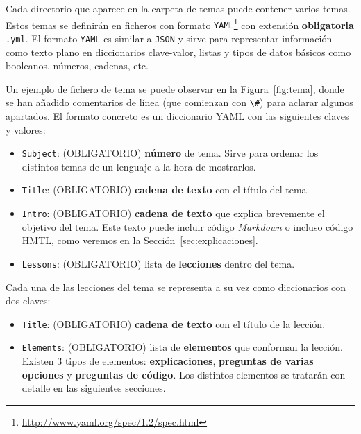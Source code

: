 \documentclass[]{article}
\newcommand{\code}[1]{{\lstinline[basicstyle=\ttfamily,mathescape]!#1!}}
\begin{document}
Cada directorio que aparece en la carpeta de temas puede contener varios temas. Estos temas se definirán en ficheros con formato \code{YAML}\footnote{\url{http://www.yaml.org/spec/1.2/spec.html}} con extensión \textbf{obligatoria} \code{.yml}. El formato \code{YAML} es similar a \code{JSON} y sirve para representar información como texto plano en diccionarios clave-valor, listas y tipos de datos básicos como booleanos, números, cadenas, etc.

Un ejemplo de fichero de tema se puede observar en la Figura~\ref{fig:tema}, donde se han añadido comentarios de línea (que comienzan con \code{\#}) para aclarar algunos apartados. El formato concreto es un diccionario YAML con las siguientes claves y valores:
\begin{itemize}
\item \code{Subject}: {\sf (OBLIGATORIO)} \textbf{número} de tema. Sirve para ordenar los distintos temas de un lenguaje a la hora de mostrarlos.
\item \code{Title}: {\sf (OBLIGATORIO)} \textbf{cadena de texto} con el título del tema. 
\item \code{Intro}: {\sf (OBLIGATORIO)} \textbf{cadena de texto} que explica brevemente el objetivo del tema. Este texto puede incluir código \emph{Markdown} o incluso código HMTL, como veremos en la Sección~\ref{sec:explicaciones}.
\item \code{Lessons}: {\sf (OBLIGATORIO)} lista de \textbf{lecciones} dentro del tema.
\end{itemize}

Cada una de las lecciones del tema se representa a su vez como diccionarios con dos claves:
\begin{itemize}
\item \code{Title}: {\sf (OBLIGATORIO)} \textbf{cadena de texto} con el título de la lección.
\item \code{Elements}: {\sf (OBLIGATORIO)}  lista de \textbf{elementos} que conforman la lección. Existen 3 tipos de elementos: \textbf{explicaciones}, \textbf{preguntas de varias opciones} y \textbf{preguntas de código}. Los distintos elementos se tratarán con detalle en las siguientes secciones.
\end{itemize}
\end{document}
